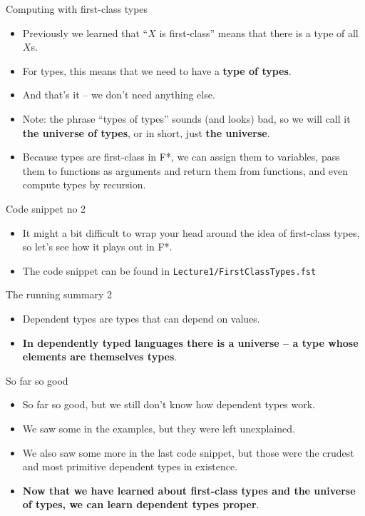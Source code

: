 \documentclass{beamer}
\newcommand{\m}[1]{\texttt{#1}}
\begin{document}
\begin{frame}{Computing with first-class types}
\begin{itemize}
	\item Previously we learned that ``$X$ is first-class'' means that there is a type of all $X$s.
	\item For types, this means that we need to have a \textbf{type of types}.
	\item And that's it -- we don't need anything else.
	\item Note: the phrase ``types of types'' sounds (and looks) bad, so we will call it \textbf{the universe of types}, or in short, just \textbf{the universe}.
	\item Because types are first-class in F*, we can assign them to variables, pass them to functions as arguments and return them from functions, and even compute types by recursion.
\end{itemize}
\end{frame}

\begin{frame}{Code snippet no 2}
\begin{itemize}
	\item It might a bit difficult to wrap your head around the idea of first-class types, so let's see how it plays out in F*.
	\item The code snippet can be found in \m{Lecture1/FirstClassTypes.fst}
\end{itemize}
\end{frame}

\begin{frame}{The running summary 2}
\begin{itemize}
	\item Dependent types are types that can depend on values.
	\item \textbf{In dependently typed languages there is a universe -- a type whose elements are themselves types}.
\end{itemize}
\end{frame}

\begin{frame}{So far so good}
\begin{itemize}
	\item So far so good, but we still don't know how dependent types work.
	\item We saw some in the examples, but they were left unexplained.
	\item We also saw some more in the last code snippet, but those were the crudest and most primitive dependent types in existence.
	\item \textbf{Now that we have learned about first-class types and the universe of types, we can learn dependent types proper}.
\end{itemize}
\end{frame}
\end{document}

